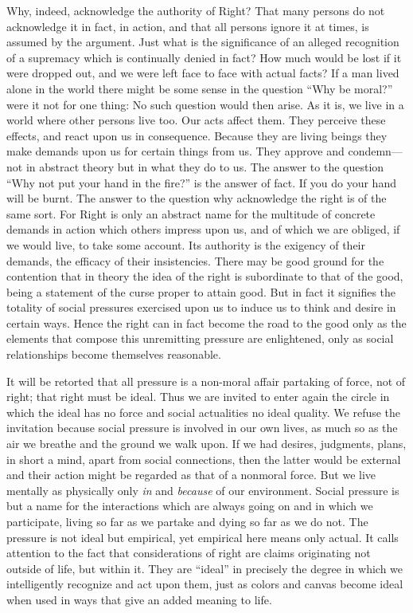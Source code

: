 Why, indeed, acknowledge the authority of Right? That many persons do
not acknowledge it in fact, in action, and that all persons ignore it
at times, is assumed by the argument. Just what is the significance of
an alleged recognition of a supremacy which is continually denied in
fact? How much would be lost if it were dropped out, and we were left
face to face with actual facts? If a man lived alone in the world
there might be some sense in the question ``Why be moral?'' were it
not for one thing: No such question would then arise. As it is, we
live in a world where other persons live too. Our acts affect them.
They perceive these effects, and react upon us in consequence. Because
they are living beings they make demands upon us for certain things
from us. They approve and con\-demn---not in abstract theory but in
what they do to us. The answer to the question ``Why not put your hand
in the fire?'' is the answer of fact. If you do your hand will be
burnt. The answer to the question why acknowledge the right is of the
same sort. For Right is only an abstract name for the multitude of
concrete demands in action which others impress upon us, and of which
we are obliged, if we would live, to take some account. Its authority
is the exigency of their demands, the efficacy of their insistencies.
There may be good ground for the contention that in theory the idea of
the right is subordinate to that of the good, being a statement of the
curse proper to attain good. But in fact it  signifies the
totality of social pressures exercised upon us to induce us to think
and desire in certain ways. Hence the right can in fact become the
road to the good only as the elements that compose this unremitting
pressure are enlightened, only as social relationships become
themselves reasonable.

It will be retorted that all pressure is a non-moral affair partaking
of force, not of right; that right must be ideal. Thus we are invited
to enter again the circle in which the ideal has no force and social
actualities no ideal quality. We refuse the invitation because social
pressure is involved in our own lives, as much so as the air we
breathe and the ground we walk upon. If we had desires, judgments,
plans, in short a mind, apart from social connections, then the latter
would be external and their action might be regarded as that of a
nonmoral force. But we live mentally as physically only \textit{in}
and \textit{because} of our environment. Social pressure is but a name
for the interactions which are always going on and in which we
participate, living so far as we partake and dying so far as we do
not. The pressure is not ideal but empirical, yet empirical here means
only actual. It calls attention to the fact that considerations of
right are claims originating not outside of life, but within it. They
are ``ideal'' in precisely the degree in which we intelligently
recognize and act upon them, just as colors and canvas become ideal
when used in ways that give an added meaning to life.

